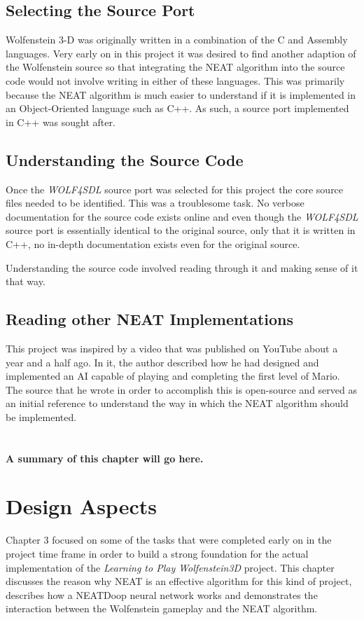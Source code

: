 \documentclass[]{Learning-to-Play-Wolfenstein-thesis}
\begin{document}
\section{Selecting the Source Port}
Wolfenstein 3-D was originally written in a combination of the C and Assembly languages. Very early on in this project it was desired to find another adaption of the Wolfenstein source so that integrating the NEAT algorithm into the source code would not involve writing in either of these languages. This was primarily because the NEAT algorithm is much easier to understand if it is implemented in an Object-Oriented language such as C++. As such, a source port implemented in C++ was sought after. 

\section{\label{section3.2}Understanding the Source Code}
Once the \textit{WOLF4SDL} source port was selected for this project the core source files needed to be identified. This was a troublesome task. No verbose documentation for the source code exists online and even though the \textit{WOLF4SDL} source port is essentially identical to the original source, only that it is written in C++, no in-depth documentation exists even for the original source. 

Understanding the source code involved reading through it and making sense of it that way.

\section{Reading other NEAT Implementations}
This project was inspired by a video that was published on YouTube about a year and a half ago. In it, the author described how he had designed and implemented an AI capable of playing and completing the first level of Mario. The source that he wrote in order to accomplish this is open-source and served as an initial reference to understand the way in which the NEAT algorithm should be implemented. \\\\\\\textbf{A summary of this chapter will go here.}


\chapter{Design Aspects}%
Chapter 3 focused on some of the tasks that were completed early on in the project time frame in order to build a strong foundation for the actual implementation of the \textit{Learning to Play Wolfenstein3D} project. This chapter discusses the reason why NEAT is an effective algorithm for this kind of project, describes how a NEATDoop neural network works and demonstrates the interaction between the Wolfenstein gameplay and the NEAT algorithm.
\end{document}
